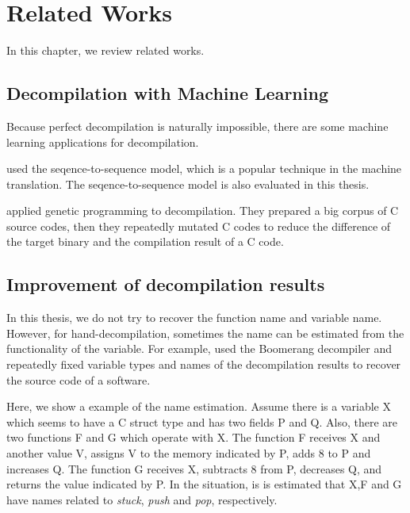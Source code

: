 \documentclass[senior,final,11pt]{iscs-thesis}
\begin{document}

\chapter{Related Works}
In this chapter, we review related works.

\section{Decompilation with Machine Learning}

Because perfect decompilation is naturally impossible, there are some machine learning applications for decompilation.

\citet{Motoneta} used the seqence-to-sequence model, which is a popular technique in the machine translation.
The seqence-to-sequence model is also evaluated in this thesis.

\citet{genetic_decompiler} applied genetic programming to decompilation.
They prepared a big corpus of C source codes, then they repeatedly mutated C codes to reduce the difference of the target binary and the compilation result of a C code. 



% 

\section{Improvement of decompilation results}
In this thesis, we do not try to recover the function name and variable name. 
However, for hand-decompilation, sometimes the name can be estimated from the functionality of the variable.
For example, \citet{hand_decompilation} used the Boomerang decompiler and repeatedly fixed variable types and names of the decompilation results 
to recover the source code of a software.

Here, we show a example of the name estimation.
Assume there is a variable X which seems to have a C struct type and has two fields P and Q.
Also, there are two functions F and G which operate with X. 
The function F receives X and another value V, assigns V to the memory indicated by P, adds 8 to P and increases Q. 
The function G receives X, subtracts 8 from P, decreases Q, and returns the value indicated by P.
In the situation, is is estimated that X,F and G have names related to {\sl stuck}, {\sl push} and {\sl pop}, respectively.
\end{document}
